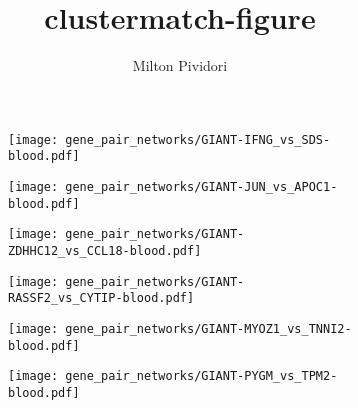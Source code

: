 \documentclass{memoir}
\title{clustermatch-figure}
\author{Milton Pividori}
\begin{document}
    \pagecolor{white}

\begin{figure}
     \centering
     \begin{subfigure}[b]{0.3\textwidth}
         \centering
         \texttt{[image: gene\_pair\_networks/GIANT-IFNG\_vs\_SDS-blood.pdf]}
     \end{subfigure}
     \hfill
     \begin{subfigure}[b]{0.3\textwidth}
         \centering
         \texttt{[image: gene\_pair\_networks/GIANT-JUN\_vs\_APOC1-blood.pdf]}
     \end{subfigure}
     \hfill
     \begin{subfigure}[b]{0.3\textwidth}
         \centering
         \texttt{[image: gene\_pair\_networks/GIANT-ZDHHC12\_vs\_CCL18-blood.pdf]}
     \end{subfigure}
     \hfill
     \begin{subfigure}[b]{0.3\textwidth}
         \centering
         \texttt{[image: gene\_pair\_networks/GIANT-RASSF2\_vs\_CYTIP-blood.pdf]}
     \end{subfigure}
     \hfill
     \begin{subfigure}[b]{0.3\textwidth}
         \centering
         \texttt{[image: gene\_pair\_networks/GIANT-MYOZ1\_vs\_TNNI2-blood.pdf]}
     \end{subfigure}
     \hfill
     \begin{subfigure}[b]{0.3\textwidth}
         \centering
         \texttt{[image: gene\_pair\_networks/GIANT-PYGM\_vs\_TPM2-blood.pdf]}
     \end{subfigure}
\end{figure}

\end{document}
